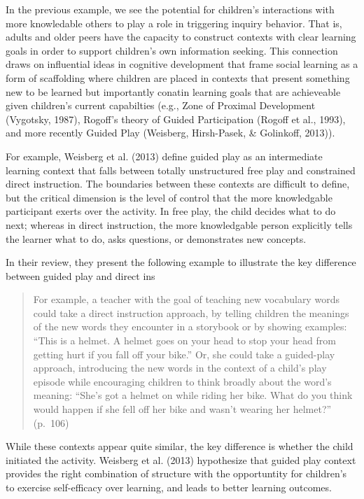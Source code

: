 \documentclass[english,man]{apa6}
\theoremstyle{definition}
\theoremstyle{definition}
\theoremstyle{definition}
\theoremstyle{remark}
\begin{document}
In the previous example, we see the potential for children's
interactions with more knowledable others to play a role in triggering
inquiry behavior. That is, adults and older peers have the capacity to
construct contexts with clear learning goals in order to support
children's own information seeking. This connection draws on influential
ideas in cognitive development that frame social learning as a form of
scaffolding where children are placed in contexts that present something
new to be learned but importantly conatin learning goals that are
achieveable given children's current capabilties (e.g., Zone of Proximal
Development (Vygotsky, 1987), Rogoff's theory of Guided Participation
(Rogoff et al., 1993), and more recently Guided Play (Weisberg,
Hirsh-Pasek, \& Golinkoff, 2013)).

For example, Weisberg et al. (2013) define guided play as an
intermediate learning context that falls between totally unstructured
free play and constrained direct instruction. The boundaries between
these contexts are difficult to define, but the critical dimension is
the level of control that the more knowledgable participant exerts over
the activity. In free play, the child decides what to do next; whereas
in direct instruction, the more knowledgable person explicitly tells the
learner what to do, asks questions, or demonstrates new concepts.

In their review, they present the following example to illustrate the
key difference between guided play and direct ins

\begin{quote}
For example, a teacher with the goal of teaching new vocabulary words
could take a direct instruction approach, by telling children the
meanings of the new words they encounter in a storybook or by showing
examples: \enquote{This is a helmet. A helmet goes on your head to stop
your head from getting hurt if you fall off your bike.} Or, she could
take a guided-play approach, introducing the new words in the context of
a child's play episode while encouraging children to think broadly about
the word's meaning: \enquote{She's got a helmet on while riding her
bike. What do you think would happen if she fell off her bike and wasn't
wearing her helmet?} (p.~106)
\end{quote}

While these contexts appear quite similar, the key difference is whether
the child initiated the activity. Weisberg et al. (2013) hypothesize
that guided play context provides the right combination of structure
with the opportuntity for children's to exercise self-efficacy over
learning, and leads to better learning outcomes.
\end{document}
